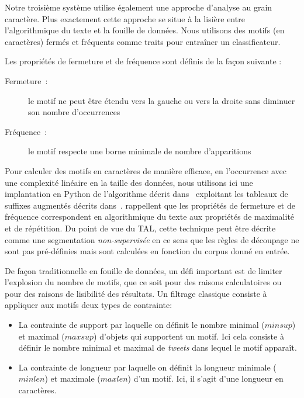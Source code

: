 Notre troisième système utilise également une approche d'analyse au grain caractère.
Plus exactement cette approche se situe à la lisière entre l'algorithmique du texte et la fouille de données.
Nous utilisons des motifs (en caractères) fermés et fréquents comme traits pour entraîner un classificateur.

Les propriétés de fermeture et de fréquence sont définis de la façon suivante :%
\begin{description}
\item[Fermeture~:] le motif ne peut être étendu vers la gauche ou vers la droite sans diminuer son nombre d'occurrences
\item[Fréquence~:] le motif respecte une borne minimale de nombre d'apparitions
\end{description}

Pour calculer des motifs en caractères de manière efficace, en l'occurrence avec une complexité linéaire en la taille des données, nous utilisons ici une implantation en Python de l'algorithme décrit dans~\cite{Ukkonen-2009} exploitant les tableaux de suffixes augmentés décrits dans~\cite{Karkka-2006}.
\cite{Buscaldi-2017} rappellent que les propriétés de fermeture et de fréquence correspondent en algorithmique du texte aux propriétés de maximalité et de répétition.
Du point de vue du TAL, cette technique peut être décrite comme une segmentation \emph{non-supervisée} en ce sens que les règles de découpage ne sont pas pré-définies mais sont calculées en fonction du corpus donné en entrée. %

De façon traditionnelle en fouille de données, un défi important est de limiter l'explosion du nombre de motifs, que ce soit pour des raisons calculatoires ou pour des raisons de lisibilité des résultats.%
Un filtrage classique consiste à appliquer aux motifs deux types de contrainte:
\begin{itemize}
\item La contrainte de support par laquelle on définit le nombre minimal ($minsup$) et maximal ($maxsup$) d'objets qui supportent un motif.
  Ici cela consiste à définir le nombre minimal et maximal de \textit{tweets} dans lequel le motif apparaît.
\item La contrainte de longueur par laquelle on définit la longueur minimale ($minlen$) et maximale ($maxlen$) d'un motif.
  Ici, il s'agit d'une longueur en caractères.
\end{itemize}

